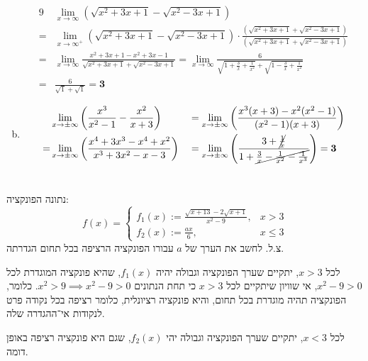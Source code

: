\documentclass[]{article}
\newcommand\she   {\selectlanguage{hebrew}}
\newcommand\limpmi{\lim_{x \to \pm \infty}}
\renewcommand\inf {\infty}
\newcommand\cl [1]    {\left ( #1 \right )}
\begin{document}
\begin{enumerate}[(a)]
		\begin{alignat*}{9}
			 & \lim_{x \to \inf} (\sqrt{x^2 + 3x + 1} - \sqrt{x^2 - 3x + 1}) \\
			=& \lim_{x \to \inf^+} (\sqrt{x^2 + 3x + 1} - \sqrt{x^2 - 3x + 1}) \cdot \frac{(\sqrt{x^2 + 3x + 1} + \sqrt{x^2 - 3x + 1})}{(\sqrt{x^2 + 3x + 1} + \sqrt{x^2 - 3x + 1})} \\
			=& \lim_{x \to \inf}\frac{x^2 + 3x + 1 - x^2 + 3x - 1}{\sqrt{x^2 + 3x + 1} + \sqrt{x^2 - 3x + 1}}
			=  \lim_{x \to \inf} \frac{6}{\sqrt{1 + \frac{3}{x} + \frac{1}{x^2}} + \sqrt{1 - \frac{3}{x} + \frac{1}{x^2}}} \\
			=& \frac{6}{\sqrt{1} + \sqrt{1}} = \bm{3}
		\end{alignat*}
		\item \begin{alignat*}{9}
			   & \limpmi\left (\frac{x^3}{x^2 - 1} - \frac{x^2}{x + 3} \right ) 
			&&=  \limpmi\cl{\frac{x^3(x + 3) - x^2(x^2 - 1)}{(x^2 - 1)(x + 3)}} \\
			  =& \limpmi\cl{\frac{x^4 + 3x^3 - x^4 + x^2}{x^3 + 3x^2 - x - 3}} 
			&&=  \limpmi\cl{\frac{3 + \cancel{\frac{1}{x}}}{1 + \cancel{\frac{3}{x} - \frac{1}{x^2} - \frac{1}{x^3}}}} = \bm{3}
		\end{alignat*}
	\end{enumerate}
	\she
	\section{} %
	נתונה הפונקציה: 
	\[ f(x) = \begin{cases}
		\displaystyle f_1(x) := \frac{\sqrt{x + 13} - 2\sqrt{x + 1}}{x^2 - 9}, &  x > 3 \\
		\displaystyle f_2(x) := \frac{ax}{6}, &x \le 3
	\end{cases} \]
	צ.ל. לחשב את הערך של $a$ עבורו הפונקציה הרציפה בכל תחום הגדרתה. 
	
	לכל $x > 3 $, יתקיים שערך הפונקציה וגבולה יהיה $f_1(x)$, שהיא פונקציה המוגדרת לכל $x^2 - 9 > 0 $, אי שוויון שיתקיים לכל $x > 3 $ כי תחת הנתונים $x^2 > 9 \implies x^2 - 9 > 0 $. כלומר, הפונקציה תהיה מוגדרת בכל תחום, והיא פונקציה רציונלית, כלומר רציפה בכל נקודה פרט לנקודות אי־ההגדרה שלה. 
	
	לכל $x < 3 $, יתקיים שערך הפונקציה וגבולה יהי $f_2(x)$, שגם היא פונקציה רציפה באופן דומה. 
	
\end{document}

